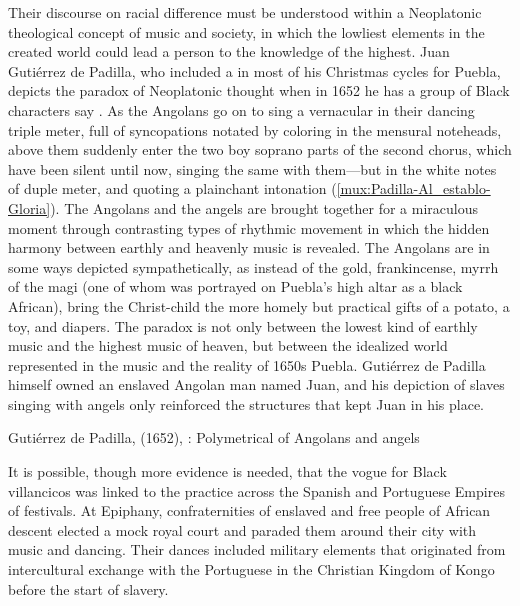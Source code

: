 Their discourse on racial difference must be understood within a Neoplatonic
theological concept of music and society, in which the lowliest elements in the
created world could lead a person to the knowledge of the highest.
Juan Gutiérrez de Padilla, who included a  in most of
his Christmas cycles for Puebla, depicts the paradox of Neoplatonic thought
when in 1652 he has a group of Black characters say .
As the Angolans go on to sing a vernacular  in their
dancing triple meter, full of syncopations notated by coloring in the mensural
noteheads, above them suddenly enter the two boy soprano parts of the second
chorus, which have been silent until now, singing the same  with
them---but in the white notes of duple meter, and quoting a plainchant
intonation (\cref{mux:Padilla-Al_establo-Gloria}).
The Angolans and the angels are brought together for a miraculous moment
through contrasting types of rhythmic movement in which the hidden harmony
between earthly and heavenly music is revealed.
The Angolans are in some ways depicted sympathetically, as instead
of the gold, frankincense, myrrh of the magi (one of whom was portrayed on
Puebla's high altar as a black African), bring the Christ-child the more homely
but practical gifts of a potato, a toy, and diapers.
The paradox is not only between the lowest kind of earthly music and the
highest music of heaven, but between the idealized world represented in the
music and the reality of 1650s Puebla.
Gutiérrez de Padilla himself owned an enslaved Angolan man named Juan, and
his depiction of slaves singing with angels only reinforced the structures that
kept Juan in his place.%
    \Autocite{Mauleon:PadillaCivil}

{Gutiérrez de Padilla,  (1652), :
Polymetrical  of Angolans and angels}

It is possible, though more evidence is needed, that the vogue for Black
villancicos was linked to the practice across the Spanish and Portuguese
Empires of  festivals.
At Epiphany, confraternities of enslaved and free people of African descent
elected a mock royal court and paraded them around their city with music and
dancing.%
    \Autocite{Fromont:DancingKingCongo}
Their dances included military elements that originated from intercultural
exchange with the Portuguese in the Christian Kingdom of Kongo before the start
of slavery.%
    \Autocites
    {Fromont:Kongo}

